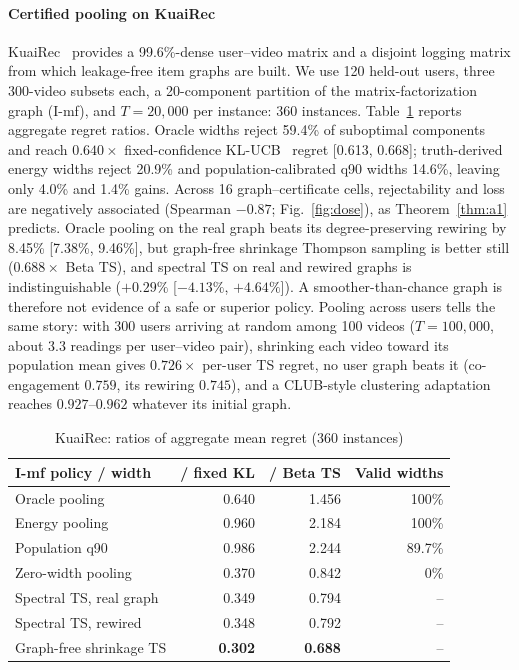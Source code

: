 \documentclass[conference]{IEEEtran}
\begin{document}
\paragraph*{Certified pooling on KuaiRec} KuaiRec~\cite{gao2022kuairec} provides a 99.6\%-dense user--video matrix and a disjoint logging matrix from which leakage-free item graphs are built. We use 120 held-out users, three 300-video subsets each, a 20-component partition of the matrix-factorization graph (I-mf), and $T=20{,}000$ per instance: 360 instances. Table~\ref{tab:certgap} reports aggregate regret ratios. Oracle widths reject 59.4\% of suboptimal components and reach $0.640\times$ fixed-confidence KL-UCB~\cite{garivier2011klucb} regret [0.613, 0.668]; truth-derived energy widths reject 20.9\% and population-calibrated q90 widths 14.6\%, leaving only 4.0\% and 1.4\% gains. Across 16 graph--certificate cells, rejectability and loss are negatively associated (Spearman $-0.87$; Fig.~\ref{fig:dose}), as Theorem~\ref{thm:a1} predicts. Oracle pooling on the real graph beats its degree-preserving rewiring by 8.45\% [7.38\%, 9.46\%], but graph-free shrinkage Thompson sampling is better still ($0.688\times$ Beta TS), and spectral TS on real and rewired graphs is indistinguishable ($+0.29\%$ [$-4.13\%$, $+4.64\%$]). A smoother-than-chance graph is therefore not evidence of a safe or superior policy. Pooling across users tells the same story: with 300 users arriving at random among 100 videos ($T=100{,}000$, about 3.3 readings per user--video pair), shrinking each video toward its population mean gives $0.726\times$ per-user TS regret, no user graph beats it (co-engagement $0.759$, its rewiring $0.745$), and a CLUB-style clustering adaptation~\cite{gentile2014clustering} reaches $0.927$--$0.962$ whatever its initial graph.

\begin{table}[t]\centering\small
\caption{KuaiRec: ratios of aggregate mean regret (360 instances)}\label{tab:certgap}
\setlength{\tabcolsep}{4pt}
\begin{tabular}{lrrr}
\toprule
I-mf policy / width & / fixed KL & / Beta TS & Valid widths \\
\midrule
Oracle pooling & 0.640 & 1.456 & 100\% \\
Energy pooling & 0.960 & 2.184 & 100\% \\
Population q90 & 0.986 & 2.244 & 89.7\% \\
Zero-width pooling & 0.370 & 0.842 & 0\% \\
Spectral TS, real graph & 0.349 & 0.794 & -- \\
Spectral TS, rewired & 0.348 & 0.792 & -- \\
Graph-free shrinkage TS & \textbf{0.302} & \textbf{0.688} & -- \\
\bottomrule
\end{tabular}
\end{table}
\end{document}
